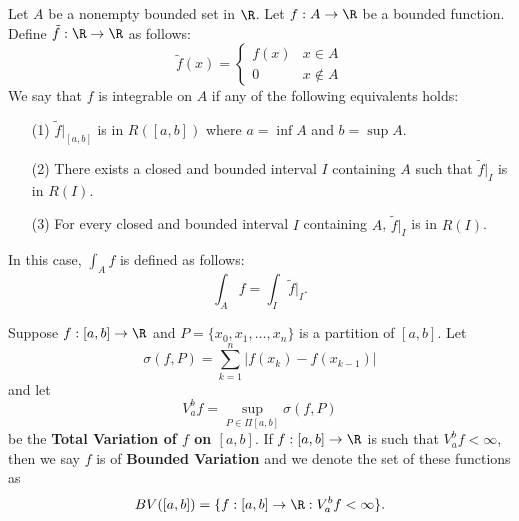 \begin{remark}
    Let \( A  \) be a nonempty bounded set in \( \R  \). Let \( f: A \to \R  \) be a bounded function. Define \( \tilde{f} : \R \to \R  \) as follows: 
    \[  \tilde{f}(x) = 
    \begin{cases}
        f(x) & x \in A  \\
        0 & x \notin A 
    \end{cases} \]
    We say that \( f  \) is integrable on \( A  \) if any of the following equivalents holds: 
    \begin{enumerate}
        \item[(1)] \( \tilde{f} \Big|_{[a,b]} \) is in \( R([a,b]) \) where \( a = \inf A  \) and \( b = \sup A  \).
        \item[(2)] There exists a closed and bounded interval \( I  \) containing \( A  \) such that \( \tilde{f} \Big|_{I} \) is in \( R(I) \).
        \item[(3)] For every closed and bounded interval \( I  \) containing \( A  \), \( \tilde{f} \Big|_{I} \) is in \( R(I) \).
    \end{enumerate}
    In this case, \( \int_{ A  } f   \) is defined as follows:
    \[  \int_{ A  } f  = \int_{ I  } \tilde{f} \Big|_{I}. \tag{where \( I  \) is any closed and bounded interval} \]
\end{remark}

\begin{definition}
    Suppose \( f:[a,b] \to \R  \) and \( P = \{ {x}_{0}, {x}_{1}, \dots, {x}_{n} \}  \) is a partition of \( [a,b] \). Let 
    \[  \sigma(f,P) = \sum_{ k=1  }^{ n } | f({x}_{k}) - f({x}_{k-1}) |  \]
    and let 
    \[  {V}_{a}^{b} f = \sup_{P \in \Pi [a,b]} \sigma(f,P) \]
    be the \textbf{Total Variation of \( f  \) on \( [a,b] \)}. If \( f : [a,b] \to \R  \) is such that \( {V}_{a}^{b} f < \infty   \), then we say \( f  \) is of \textbf{Bounded Variation} and we denote the set of these functions as 
    \[  BV ([a,b]) = \{ f:[a,b] \to \R : {V}_{a}^{b} f < \infty  \}. \]
\end{definition}

